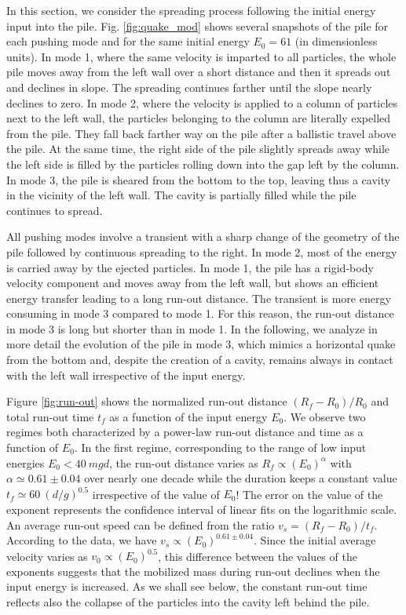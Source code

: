In this section, we consider the spreading process 
following the initial energy input into the pile. 
Fig. \ref{fig:quake_mod} shows several snapshots of the pile 
for each pushing mode and for the same initial 
energy $E_0 = 61$ (in dimensionless units). 
In mode 1, where the same velocity is imparted to 
all particles, the whole pile moves away  from 
the left wall over a short distance and then it 
spreads out and declines in slope. 
 The spreading continues farther until the slope nearly 
declines to zero. In mode 2, where the velocity is applied to 
a  column of particles next to the left wall, the particles belonging to 
the column are literally expelled from the pile. They fall back farther way on 
the pile after 
a ballistic travel above the pile. At the same time, the right side of the 
pile slightly spreads away  
while the left side is filled by the particles rolling down into the gap 
left by the column. In mode 3, the pile is  
sheared from the bottom to the top, leaving thus a cavity in the 
vicinity of the left wall. The cavity is partially filled while the pile 
continues to spread. 

All pushing modes involve a transient with a sharp change 
of the geometry of the pile followed by continuous spreading to the right. 
In mode 2, most of the energy is carried away by the ejected particles. 
In mode 1, the pile has a rigid-body velocity component and moves 
away from the left wall, but shows an efficient energy transfer leading to a 
long run-out distance.      
The transient is more energy consuming in  mode 3  compared to 
mode 1. For this reason, the run-out distance in mode 3 is long but shorter 
than in mode 1. In the following, we analyze in more detail 
the evolution of the pile in mode 3, which mimics a  
horizontal quake from the bottom and, despite the creation of a cavity, 
remains always in contact with the left wall irrespective of the input 
energy.   


Figure \ref{fig:run-out} shows the normalized run-out distance $(R_f - R_0)/R_0$ 
and total run-out time $t_f$ as a function of the input energy $E_0$. We observe 
two regimes both characterized by a power-law run-out distance and time as a 
function of $E_0$. In the first regime, corresponding to the range of low input 
energies $E_0 < 40 \ mgd$, the run-out distance varies as $R_f \propto 
(E_0)^\alpha$ with $\alpha \simeq 0.61 \pm 0.04$ over nearly one decade while 
the duration keeps a constant value  $t_f \simeq 60 \  (d/g)^{0.5}$ 
irrespective of the value of $E_0$! The error  on the value of the exponent 
represents the confidence interval of linear fits on the logarithmic scale.  
An average run-out speed can be defined from the ratio $v_s = (R_f - R_0) / 
t_f$. According to the data, we have $v_s \propto (E_0)^{0.61\pm 0.04}$. Since 
the initial average velocity varies as $v_0 \propto (E_0)^{0.5}$, this 
difference between the values of the exponents suggests that the mobilized mass 
during run-out declines when the input energy is increased. As we shall see 
below, the constant run-out time reflects also the collapse of the particles 
into the cavity left behind the pile. 

